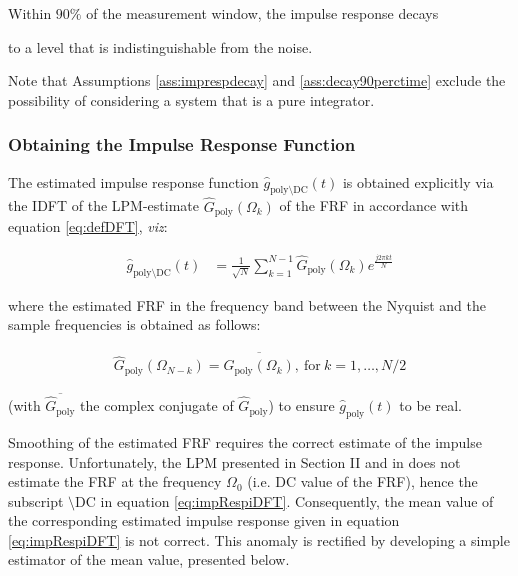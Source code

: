 \begin{assumption}\label{ass:decay90perctime}
Within $90\%$ of the measurement window, the impulse response decays 

 to a level that is indistinguishable from the noise. 

\end{assumption}

Note that Assumptions \ref{ass:imprespdecay} and \ref{ass:decay90perctime} exclude the possibility of considering a system that is a pure integrator.




\subsubsection{Obtaining the Impulse Response Function}

The estimated impulse response function  $\hat g_{\mathrm{poly}\setminus \mathrm{DC
}}(t)$ is obtained explicitly via the IDFT of the LPM-estimate $\hat G_\mathrm{poly}(\Omega_k)$ of the FRF in accordance with equation \eqref{eq:defDFT}, \emph{viz}:

\begin{align}\label{eq:impRespiDFT}
\hat g_{\mathrm{poly}\setminus \mathrm{DC
}}(t) &= \frac{1}{\sqrt{N}}\sum_{k=1}^{N-1}\hat G_\mathrm{poly}(\Omega_k)e^{\frac{j2\pi kt}{N}}
\end{align}


\noindent where the estimated FRF in the frequency band between  the Nyquist and the sample frequencies is obtained as follows:

\begin{align}
\hat G_\mathrm{poly}(\Omega_{N-k}) = \overline{\hat G_\mathrm{poly}(\Omega_k)},\ \text{for}\ k=1,\dots,N/2
\end{align}

\noindent 
(with $\overline{\hat G_\mathrm{poly}}$ the complex conjugate of $\hat G_\mathrm{poly}$)
to ensure $\hat g_\mathrm{poly}(t)$ to be real.


Smoothing of the estimated FRF requires the correct estimate of the impulse response. Unfortunately, the LPM presented in Section II and in \cite{schoukens2010nonparametric} does not estimate the FRF  at the frequency $\Omega_0$ (i.e. DC value of the FRF), hence the subscript $\setminus\mathrm{DC}$ in equation \eqref{eq:impRespiDFT}. Consequently, the mean value of the corresponding estimated impulse response given in equation \eqref{eq:impRespiDFT} is not correct. This anomaly is rectified by developing a simple estimator of the mean value, presented below.







